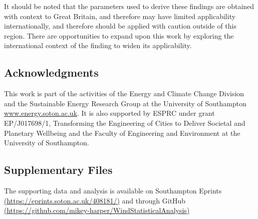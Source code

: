 \documentclass[a4paper,]{article}
\theoremstyle{definition}
\theoremstyle{definition}
\theoremstyle{remark}
\begin{document}
{It should be noted that the parameters used to derive these findings are
obtained with context to Great Britain, and therefore may have limited
applicability internationally, and therefore should be applied with
caution outside of this region. There are opportunities to expand upon
this work by exploring the international context of the finding to widen
its applicability.

\subsection*{Acknowledgments}\label{acknowledgments}

This work is part of the activities of the Energy and Climate Change
Division and the Sustainable Energy Research Group at the University of
Southampton \url{www.energy.soton.ac.uk}. It is also supported by ESPRC
under grant EP/J017698/1, Transforming the Engineering of Cities to
Deliver Societal and Planetary Wellbeing and the Faculty of Engineering
and Environment at the University of Southampton.

\subsection*{Supplementary Files}\label{supplementary-files}

The supporting data and analysis is available on Southampton Eprints
\href{https://eprints.soton.ac.uk/408181/}{(https://eprints.soton.ac.uk/408181/)}
and through GitHub
\href{https://github.com/mikey-harper/WindStatisticalAnalysis}{(https://github.com/mikey-harper/WindStatisticalAnalysis)}

\begin{landscape}\begin{table}


\end{table}
\end{landscape}}
\end{document}
